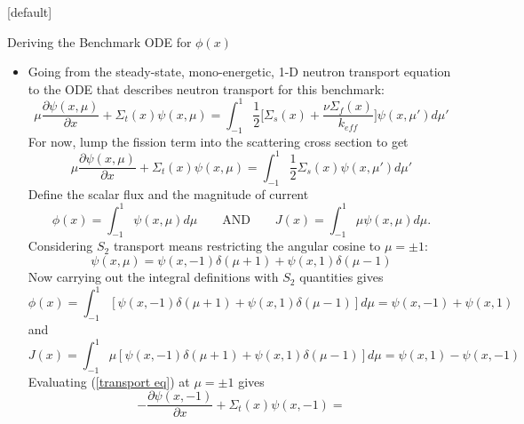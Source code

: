 \documentclass[9pt,t,aspectratio=169]{beamer}
\makeatletter
\newcommand{\QAND}{\qquad \text{AND} \qquad}
\newenvironment{withoutheadline}{
       \setbeamertemplate{headline}[default]
       \def\beamer@entrycode{\vspace*{-\headheight}}
    }{}
\makeatother
\begin{document}
\begin{withoutheadline}
\begin{frame}[allowframebreaks]{Deriving the Benchmark ODE for $\phi(x)$}
    \begin{itemize}
        \item Going from the steady-state, mono-energetic, 1-D neutron transport equation to the ODE that describes neutron transport for this benchmark:
        \begin{equation}
            \mu \frac{\partial \psi(x,\mu)}{\partial x} + \Sigma_{t}(x)\psi(x,\mu) =
            \int_{-1}^{1} \frac{1}{2}\big[\Sigma_{s}(x) + \frac{\nu \Sigma_{f}(x)}{k_{eff}}\big] \psi(x,\mu')d\mu'
        \end{equation}
        For now, lump the fission term into the scattering cross section to get
        \begin{equation} \label{transport eq}
            \mu \frac{\partial \psi(x,\mu)}{\partial x} + \Sigma_{t}(x)\psi(x,\mu) =
            \int_{-1}^{1} \frac{1}{2}\Sigma_{s}(x) \psi(x,\mu')d\mu'
        \end{equation}
        Define the scalar flux and the magnitude of current
        \begin{equation}
            \phi(x) = \int_{-1}^{1} \psi(x,\mu) d\mu \QAND J(x) = \int_{-1}^{1} \mu \psi(x,\mu) d\mu.
        \end{equation}
        Considering $S_{2}$ transport means restricting the angular cosine to $\mu = \pm 1$:
        \begin{equation}
            \psi(x,\mu) = \psi(x,-1) \delta(\mu+1) + \psi(x,1) \delta(\mu-1)
        \end{equation}
        \newpage
        Now carrying out the integral definitions with $S_{2}$ quantities gives
        \begin{equation} \label{scalar flux}
            \phi(x) = \int_{-1}^{1} \left\lbrack \psi(x,-1) \delta(\mu+1) + \psi(x,1) \delta(\mu-1) \right\rbrack d\mu =
            \psi(x,-1) + \psi(x,1)
        \end{equation}
        and
        \begin{equation} \label{current}
            J(x) = \int_{-1}^{1} \mu \left\lbrack \psi(x,-1) \delta(\mu+1) + \psi(x,1) \delta(\mu-1) \right\rbrack d\mu =
            \psi(x,1) - \psi(x,-1)
        \end{equation}
        Evaluating (\ref{transport eq}) at $\mu=\pm 1$ gives
        \begin{equation} \label{-1}
            -\frac{\partial \psi(x,-1)}{\partial x} + \Sigma_{t}(x)\psi(x,-1) =

\end{equation}
\end{itemize}
\end{frame}
\end{withoutheadline}
\end{document}
